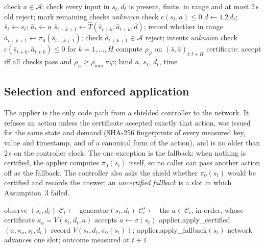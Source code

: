 \documentclass[conference]{IEEEtran}
\newcommand{\That}{\hat{T}}
\newcommand{\dbar}{\bar{d}}
\newcommand{\shat}{\hat{s}}
\newcommand{\ahat}{\hat{a}}
\newcommand{\Acal}{\mathcal{A}}
\newcommand{\Ccal}{\mathcal{C}}
\newcommand{\rhomin}{\rho_{\min}}
\begin{document}
\begin{algorithm}[t]
\caption{Verification shield $V(s_t, d_t, a)$}
\label{alg:shield}
\footnotesize
\begin{algorithmic}[1]
\State check $a\in\Acal$; check every input in $s_t,d_t$ is present, finite, in range and at most 2\,s old
 \Return reject; mark remaining checks \emph{unknown} \EndIf
\State check $c(s_t,a)\le 0$
\State $\dbar \gets 1.2\, d_t$; $\shat_t\gets s_t$; $\ahat_t\gets a$
  \State $\shat_{t+k+1} \gets \That(\shat_{t+k},\ahat_{t+k},\dbar)$; record whether in range
  \State $\ahat_{t+k+1} \gets \pi_0(\shat_{t+k+1})$; check $\ahat_{t+k+1}\in\Acal$
\EndFor
\If{$\That$ out of range or fallback invalid} \Return reject; intents \emph{unknown} \EndIf
\State check $c(\shat_{t+k},\ahat_{t+k})\le 0$ for $k=1,\dots,H$
 compute $\rho_\varphi$ on $(\shat,\ahat)_{t:t+H}$ \EndFor
\State \Return certificate: accept iff all checks pass and $\rho_\varphi\ge\rhomin\ \forall\varphi$; bind $a$, $s_t$, $d_t$, time
\end{algorithmic}
\end{algorithm}

\subsection{Selection and enforced application}
The applier is the only code path from a shielded controller to the network. It
refuses an action unless the certificate accepted exactly that action, was issued
for the same state and demand (SHA-256 fingerprints of every measured key, value and
timestamp, and of a canonical form of the action), and is no older than 2\,s on the
controller clock. The one exception is the fallback: when nothing is certified, the applier
computes $\pi_0(s_t)$ itself, so no caller can pass another action off as the
fallback. The controller also asks the shield whether $\pi_0(s_t)$ would be
certified and records the answer; an \emph{uncertified fallback} is a slot in which
Assumption~3 failed.

\begin{algorithm}[t]
\caption{One slot of the shielded controller}
\label{alg:loop}
\footnotesize
\begin{algorithmic}[1]
\State observe $(s_t, d_t)$ 
\State $\Ccal_t \gets$ generator$(s_t,d_t)$ 
\State $\Ccal^\star_t \gets$ the $a\in\Ccal_t$, in order, whose certificate $\kappa_a = V(s_t,d_t,a)$ accepts 
\If{$\Ccal^\star_t\neq\emptyset$}
    \State $a \gets \sigma(s_t)$ 
  \State applier.apply\_certified$(a,\kappa_a,s_t,d_t)$ 
\Else
  \State record $V(s_t,d_t,\pi_0(s_t))$; applier.apply\_fallback$(s_t)$ 
\EndIf
\State network advances one slot; outcome measured at $t+1$ 
\end{algorithmic}
\end{algorithm}
\end{document}
